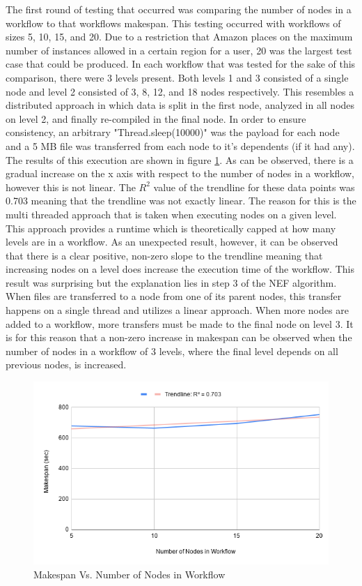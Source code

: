 \documentclass[fleqn,10pt]{SelfArx} %
\begin{document}
The first round of testing that occurred was comparing the number of nodes in a workflow to that workflows makespan. This testing occurred with workflows of sizes 5, 10, 15, and 20. Due to a restriction that Amazon places on the maximum number of instances allowed in a certain region for a user, 20 was the largest test case that could be produced. In each workflow that was tested for the sake of this comparison, there were 3 levels present. Both levels 1 and 3 consisted of a single node and level 2 consisted of 3, 8, 12, and 18 nodes respectively. This resembles a distributed approach in which data is split in the first node, analyzed in all nodes on level 2, and finally re-compiled in the final node. In order to ensure consistency, an arbitrary "Thread.sleep(10000)" was the payload for each node and a 5 MB file was transferred from each node to it's dependents (if it had any). The results of this execution are shown in figure \ref{fig:tr1}. As can be observed, there is a gradual increase on the x axis with respect to the number of nodes in a workflow, however this is not linear. The $R^2$ value of the trendline for these data points was 0.703 meaning that the trendline was not exactly linear. The reason for this is the multi threaded approach that is taken when executing nodes on a given level. This approach provides a runtime which is theoretically capped at how many levels are in a workflow. As an unexpected result, however, it can be observed that there is a clear positive, non-zero slope to the trendline meaning that increasing nodes on a level does increase the execution time of the workflow. This result was surprising but the explanation lies in step 3 of the NEF algorithm. When files are transferred to a node from one of its parent nodes, this transfer happens on a single thread and utilizes a linear approach. When more nodes are added to a workflow, more transfers must be made to the final node on level 3. It is for this reason that a non-zero increase in makespan can be observed when the number of nodes in a workflow of 3 levels, where the final level depends on all previous nodes, is increased.

\begin{figure}[t]
\centering
\includegraphics[width=\linewidth]{Figures/makespan_vs_nodecount.png}
\caption{Makespan Vs. Number of Nodes in Workflow}
\label{fig:tr1}
\end{figure}
\end{document}
